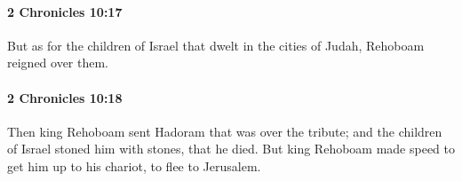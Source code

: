 		\paragraph{2 Chronicles 10:17} %
			\label{2CHRONICLES-10-17}

			But as for the children of Israel that dwelt in the cities of Judah, Rehoboam reigned over them.


		\paragraph{2 Chronicles 10:18} %
			\label{2CHRONICLES-10-18}

			Then king Rehoboam sent Hadoram that was over the tribute; and the children of Israel stoned him with stones, that he died. But king Rehoboam made speed to get him up to his chariot, to flee to Jerusalem.


